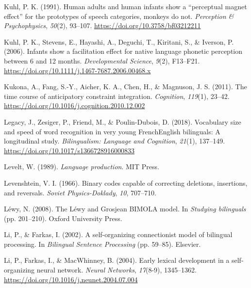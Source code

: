 \documentclass[
  12pt,
  b5paperpaper,
  twoside]{scrreprt}
\newlength{\cslhangindent}
\newlength{\cslentryspacingunit} %
\newenvironment{CSLReferences}[2] %
 {%
  \setlength{\parindent}{0pt}
  \ifodd #1
  \let\oldpar\par
  \def\par{\hangindent=\cslhangindent\oldpar}
  \fi
  \setlength{\parskip}{#2\cslentryspacingunit}
 }%
 {}
\begin{document}
\begin{CSLReferences}{1}{0}
\leavevmode{}%
Kuhl, P. K. (1991). Human adults and human infants show a {``perceptual
magnet effect''} for the prototypes of speech categories, monkeys do
not. \emph{Perception \& Psychophysics}, \emph{50}(2), 93--107.
\url{https://doi.org/10.3758/bf03212211}

\leavevmode{}%
Kuhl, P. K., Stevens, E., Hayashi, A., Deguchi, T., Kiritani, S., \&
Iverson, P. (2006). Infants show a facilitation effect for native
language phonetic perception between 6 and 12 months.
\emph{Developmental Science}, \emph{9}(2), F13--F21.
\url{https://doi.org/10.1111/j.1467-7687.2006.00468.x}

\leavevmode{}%
Kukona, A., Fang, S.-Y., Aicher, K. A., Chen, H., \& Magnuson, J. S.
(2011). The time course of anticipatory constraint integration.
\emph{Cognition}, \emph{119}(1), 23--42.
\url{https://doi.org/10.1016/j.cognition.2010.12.002}

\leavevmode{}%
Legacy, J., Zesiger, P., Friend, M., \& Poulin-Dubois, D. (2018).
Vocabulary size and speed of word recognition in very young
{French}{\textendash}{English} bilinguals: A longitudinal study.
\emph{Bilingualism: Language and Cognition}, \emph{21}(1), 137--149.
\url{https://doi.org/10.1017/s1366728916000833}

\leavevmode{}%
Levelt, W. (1989). \emph{Language production}. {MIT Press}.

\leavevmode{}%
Levenshtein, V. I. (1966). Binary codes capable of correcting deletions,
insertions, and reversals. \emph{Soviet {Physics-Doklady}}, \emph{10},
707--710.

\leavevmode{}%
Léwy, N. (2008). The {L{é}wy} and {Grosjean BIMOLA} model. In
\emph{Studying bilinguals} (pp. 201--210). {Oxford University Press}.

\leavevmode{}%
Li, P., \& Farkas, I. (2002). A self-organizing connectionist model of
bilingual processing. In \emph{Bilingual {Sentence Processing}} (pp.
59--85). {Elsevier}.

\leavevmode{}%
Li, P., Farkas, I., \& MacWhinney, B. (2004). Early lexical development
in a self-organizing neural network. \emph{Neural Networks},
\emph{17}(8-9), 1345--1362.
\url{https://doi.org/10.1016/j.neunet.2004.07.004}


\end{CSLReferences}
\end{document}

